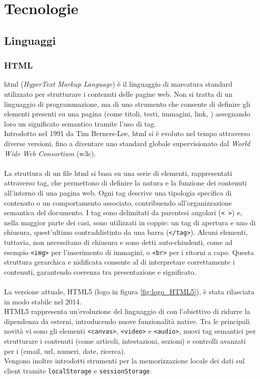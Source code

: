 \chapter{Tecnologie}
\label{chap:linguaggi-tecnologie}

\section{Linguaggi}
\subsection{HTML}
\label{subsec:html}
\noindent \acrshort{html} (\textit{HyperText Markup Language}) è il linguaggio di marcatura standard utilizzato per strutturare i contenuti delle pagine web. Non si tratta di un linguaggio di programmazione, ma di uno strumento che consente di definire gli elementi presenti su una pagina (come titoli, testi, immagini, link, ) assegnando loro un significato semantico tramite l’uso di tag. \\
Introdotto nel 1991 da Tim Berners-Lee, \acrshort{html} si è evoluto nel tempo attraverso diverse versioni, fino a diventare uno standard globale supervisionato dal \textit{World Wide Web Consortium} (\acrshort{w3c}).\\
\\
La struttura di un file \acrshort{html} si basa su una serie di elementi, rappresentati attraverso tag, che permettono di definire la natura e la funzione dei contenuti all'interno di una pagina web. Ogni tag descrive una tipologia specifica di contenuto o un comportamento associato, contribuendo all'organizzazione semantica del documento. I tag sono delimitati da parentesi angolari (\texttt{< >}) e, nella maggior parte dei casi, sono utilizzati in coppie: un tag di apertura e uno di chiusura, quest’ultimo contraddistinto da una barra (\texttt{</tag>}). Alcuni elementi, tuttavia, non necessitano di chiusura e sono detti auto-chiudenti, come ad esempio \texttt{<img>} per l’inserimento di immagini, o \texttt{<br>} per i ritorni a capo. Questa struttura gerarchica e nidificata consente al  di interpretare correttamente i contenuti, garantendo coerenza tra presentazione e significato.\\
\\
La versione attuale, HTML5 (logo in figura \ref{fig:logo_HTML5}), è stata rilasciata in modo stabile nel 2014.\\
HTML5 rappresenta un’evoluzione del linguaggio di  con l’obiettivo di ridurre la dipendenza da  esterni, introducendo nuove funzionalità native. Tra le principali novità vi sono gli elementi \texttt{<canvas>}, \texttt{<video>} e \texttt{<audio>}, nuovi tag semantici per strutturare i contenuti (come articoli, intestazioni, sezioni) e controlli avanzati per i  (email, \acrshort{url}, numeri, date, ricerca). 
\\Vengono inoltre introdotti strumenti per la memorizzazione locale dei dati sul client tramite \texttt{localStorage} e \texttt{sessionStorage}.

